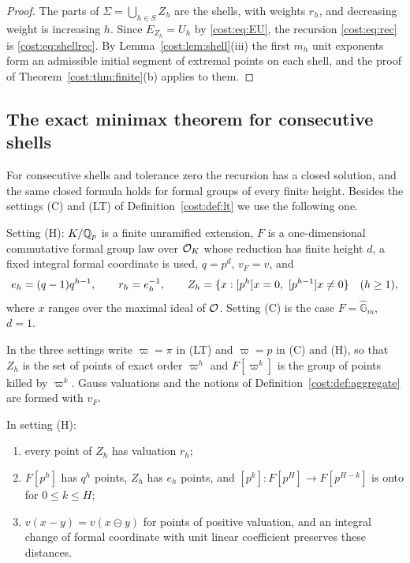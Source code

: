 \begin{proof}
The parts of $\Sigma=\bigcup_{h\in S}Z_h$ are the shells, with weights $r_h$, and decreasing
weight is increasing $h$. Since $E_{Z_h}=U_h$ by \eqref{cost:eq:EU}, the recursion
\eqref{cost:eq:rec} is \eqref{cost:eq:shellrec}. By Lemma~\ref{cost:lem:shell}(iii) the first $m_h$ unit exponents form
an admissible initial segment of extremal points on each shell, and the proof of
Theorem~\ref{cost:thm:finite}(b) applies to them.
\end{proof}

\subsection{The exact minimax theorem for consecutive shells}\label{cost:sec:minimax}
{\raggedright{}}

For consecutive shells and tolerance zero the recursion has a closed solution, and the same
closed formula holds for formal groups of every finite height. Besides the settings (C) and
(LT) of Definition~\ref{cost:def:lt} we use the following one.

\begin{definition}\label{cost:def:height}
Setting \textup{(H)}: $K/\mathbb{Q}_p$ is a finite unramified extension, $F$ is a one-dimensional
commutative formal group law over $\mathcal{O}_K$ whose reduction has finite height $d$, a fixed
integral formal coordinate is used, $q=p^d$, $v_F=v$, and
\[
 e_h=(q-1)q^{h-1},\qquad r_h=e_h^{-1},\qquad
 Z_h=\{x:[p^h]x=0,\ [p^{h-1}]x\ne0\}\quad(h\ge1),
\]
where $x$ ranges over the maximal ideal of $\mathcal{O}$. Setting \textup{(C)} is the case
$F=\widehat{\mathbb G}_m$, $d=1$.
\end{definition}

In the three settings write $\varpi=\pi$ in (LT) and $\varpi=p$ in (C) and (H), so that $Z_h$
is the set of points of exact order $\varpi^h$ and $F[\varpi^k]$ is the group of points
killed by $\varpi^k$. Gauss valuations and the notions of Definition~\ref{cost:def:aggregate} are
formed with $v_F$.

\begin{lemma}\label{cost:lem:height}
In setting \textup{(H)}:
\begin{enumerate}[label=\textup{(\roman*)}]
\item every point of $Z_h$ has valuation $r_h$;
\item $F[p^h]$ has $q^h$ points, $Z_h$ has $e_h$ points, and
$[p^k]\colon F[p^H]\to F[p^{H-k}]$ is onto for $0\le k\le H$;
\item $v(x-y)=v(x\ominus y)$ for points of positive valuation, and an integral change of
formal coordinate with unit linear coefficient preserves these distances.
\end{enumerate}
\end{lemma}

